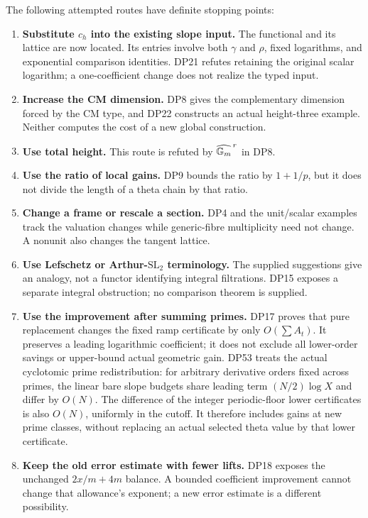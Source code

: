 \documentclass[11pt,a4paper]{article}
\theoremstyle{definition}\newtheorem{remark}[theorem]{Remark}
\begin{document}
The following attempted routes have definite stopping points:
\begin{enumerate}[leftmargin=*,label=\arabic*.]
\item \textbf{Substitute $c_h$ into the existing slope input.} The functional and its lattice are now located. Its entries involve both $\gamma$ and $\rho$, fixed logarithms, and exponential comparison identities. DP21 refutes retaining the original scalar logarithm; a one-coefficient change does not realize the typed input.
\item \textbf{Increase the CM dimension.} DP8 gives the complementary dimension forced by the CM type, and DP22 constructs an actual height-three example. Neither computes the cost of a new global construction.
\item \textbf{Use total height.} This route is refuted by $\widehat{\mathbb G_m}^{\,r}$ in DP8.
\item \textbf{Use the ratio of local gains.} DP9 bounds the ratio by $1+1/p$, but it does not divide the length of a theta chain by that ratio.
\item \textbf{Change a frame or rescale a section.} DP4 and the unit/scalar examples track the valuation changes while generic-fibre multiplicity need not change. A nonunit also changes the tangent lattice.
\item \textbf{Use Lefschetz or Arthur-$\mathrm{SL}_2$ terminology.} The supplied suggestions give an analogy, not a functor identifying integral filtrations. DP15 exposes a separate integral obstruction; no comparison theorem is supplied.
\item \textbf{Use the improvement after summing primes.} DP17 proves that pure replacement changes the fixed ramp certificate by only $O(\sum A_t)$. It preserves a leading logarithmic coefficient; it does not exclude all lower-order savings or upper-bound actual geometric gain. DP53 treats the actual cyclotomic prime redistribution: for arbitrary derivative orders fixed across primes, the linear bare slope budgets share leading term $(N/2)\log X$ and differ by $O(N)$. The difference of the integer periodic-floor lower certificates is also $O(N)$, uniformly in the cutoff. It therefore includes gains at new prime classes, without replacing an actual selected theta value by that lower certificate.
\item \textbf{Keep the old error estimate with fewer lifts.} DP18 exposes the unchanged $2x/m+4m$ balance. A bounded coefficient improvement cannot change that allowance's exponent; a new error estimate is a different possibility.

\end{enumerate}
\end{document}
